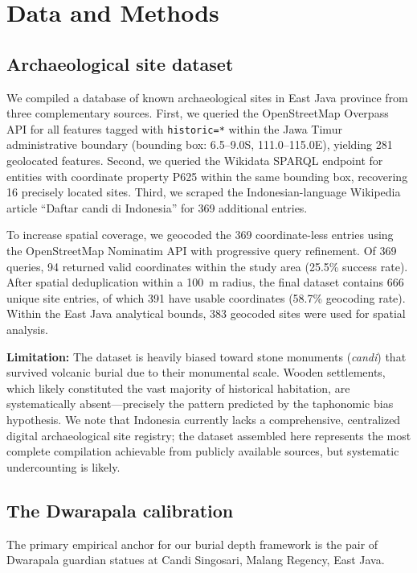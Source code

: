 \documentclass[12pt,a4paper]{article}
\begin{document}
\section{Data and Methods}

\subsection{Archaeological site dataset}

We compiled a database of known archaeological sites in East Java province from three complementary sources. First, we queried the OpenStreetMap Overpass API for all features tagged with \texttt{historic=*} within the Jawa Timur administrative boundary (bounding box: 6.5--9.0\textdegree{}S, 111.0--115.0\textdegree{}E), yielding 281 geolocated features. Second, we queried the Wikidata SPARQL endpoint for entities with coordinate property P625 within the same bounding box, recovering 16 precisely located sites. Third, we scraped the Indonesian-language Wikipedia article ``Daftar candi di Indonesia'' for 369 additional entries.

To increase spatial coverage, we geocoded the 369 coordinate-less entries using the OpenStreetMap Nominatim API with progressive query refinement. Of 369 queries, 94 returned valid coordinates within the study area (25.5\% success rate). After spatial deduplication within a 100~m radius, the final dataset contains 666 unique site entries, of which 391 have usable coordinates (58.7\% geocoding rate). Within the East Java analytical bounds, 383 geocoded sites were used for spatial analysis.

\textbf{Limitation:} The dataset is heavily biased toward stone monuments (\textit{candi}) that survived volcanic burial due to their monumental scale. Wooden settlements, which likely constituted the vast majority of historical habitation, are systematically absent---precisely the pattern predicted by the taphonomic bias hypothesis. We note that Indonesia currently lacks a comprehensive, centralized digital archaeological site registry; the dataset assembled here represents the most complete compilation achievable from publicly available sources, but systematic undercounting is likely.

\subsection{The Dwarapala calibration}

The primary empirical anchor for our burial depth framework is the pair of Dwarapala guardian statues at Candi Singosari, Malang Regency, East Java.
\end{document}
